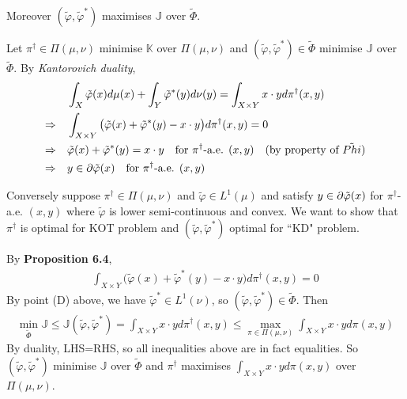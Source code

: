 \documentclass[12pt,a4paper]{article}
\newenvironment{proof}
{\begin{changemargin}{1cm}{0.5cm} 
	}%
	{\end{changemargin}
}
\newenvironment{p}
{\begin{proof} 
	}%
	{\end{proof}
}
\begin{document}
\quad Moreover $(\tilde{\varphi}, \tilde{\varphi}^*)$ maximises $\mathbb{J}$ over $\tilde{\Phi}$.
\begin{p}
\pf Let $\pi^{\dagger} \in \Pi(\mu, \nu)$ minimise $\mathbb{K}$ over $\Pi(\mu, \nu)$ and $(\tilde{\varphi}, \tilde{\varphi}^*) \in \tilde{\Phi}$ minimise $\mathbb{J}$ over $\tilde{\Phi}$. By \emph{Kantorovich duality},
\begin{align*}
&\int_X \tilde{\varphi}(x) d\mu(x) + \int_Y \tilde{\varphi}^*(y) d\nu(y) =\int_{X\times Y} x\cdot y d\pi^{\dagger}(x,y) \\
\Rightarrow \quad  &\int_{X\times Y} \big( \tilde{\varphi}(x) + \tilde{\varphi}^*(y) - x\cdot y\big) d\pi^{\dagger}(x,y) =0 \\
\Rightarrow \quad & \tilde{\varphi}(x) + \tilde{\varphi}^*(y) = x\cdot y \quad \text{for } \pi^{\dagger}\text{-a.e. }(x,y) \quad \text{(by property of } \tilde{Phi}) \\
\Rightarrow \quad &y\in \partial \tilde{\varphi}(x) \quad \text{for } \pi^{\dagger} \text{-a.e. }(x,y) 
\end{align*}

Conversely suppose $\pi^{\dagger} \in \Pi(\mu, \nu)$ and $\tilde{\varphi} \in L^1(\mu)$ and satisfy $y\in \partial \tilde{\varphi}(x)$ for $\pi^{\dagger}$-a.e. $(x,y)$ where $\tilde{\varphi}$ is lower semi-continuous and convex. We want to show that $\pi^{\dagger}$ is optimal for KOT problem and $(\tilde{\varphi}, \tilde{\varphi}^*)$ optimal for ``KD" problem.

\quad By \textbf{Proposition 6.4},
\begin{align*}
\int_{X\times Y} \big( \tilde{\varphi}(x) + \tilde{\varphi}^*(y) - x\cdot y \big) d\pi^{\dagger}(x,y) =0
\end{align*}
By point (D) above, we have $\tilde{\varphi}^* \in L^1(\nu)$, so $(\tilde{\varphi}, \tilde{\varphi}^*) \in \tilde{\Phi}$. Then
\begin{align*}
\min_{\tilde{\Phi}} \mathbb{J} \leq \mathbb{J}(\tilde{\varphi}, \tilde{\varphi}^*) = \int_{X\times Y} x\cdot y d\pi^{\dagger}(x,y) \leq \max_{\pi \in \Pi(\mu, \nu)} \int_{X\times Y} x\cdot y d\pi(x,y)
\end{align*}
By duality, LHS=RHS, so all inequalities above are in fact equalities. So $(\tilde{\varphi}, \tilde{\varphi}^*)$ minimise $\mathbb{J}$ over $\tilde{\Phi}$ and $\pi^{\dagger}$ maximises $\int_{X\times Y} x\cdot y d\pi(x,y)$ over $\Pi(\mu, \nu)$.

\eop
\end{p}
\end{document}
